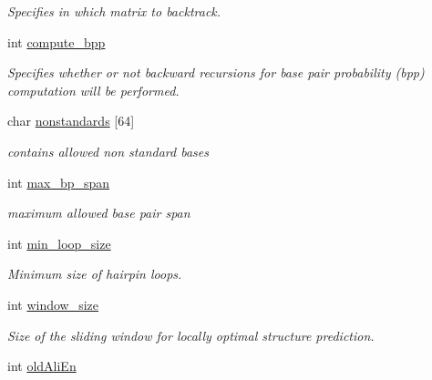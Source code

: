 \begin{DoxyCompactItemize}
\begin{DoxyCompactList}\small\item\em Specifies in which matrix to backtrack. \end{DoxyCompactList}\item 
int \hyperlink{structvrna__md__s_aa0c3e03d9064363e27adcc92b8d0380f}{compute\+\_\+bpp}\hypertarget{structvrna__md__s_aa0c3e03d9064363e27adcc92b8d0380f}{}\label{structvrna__md__s_aa0c3e03d9064363e27adcc92b8d0380f}

\begin{DoxyCompactList}\small\item\em Specifies whether or not backward recursions for base pair probability (bpp) computation will be performed. \end{DoxyCompactList}\item 
char \hyperlink{structvrna__md__s_a3fde4ac9eaf972f503c7a76726cefb59}{nonstandards} \mbox{[}64\mbox{]}\hypertarget{structvrna__md__s_a3fde4ac9eaf972f503c7a76726cefb59}{}\label{structvrna__md__s_a3fde4ac9eaf972f503c7a76726cefb59}

\begin{DoxyCompactList}\small\item\em contains allowed non standard bases \end{DoxyCompactList}\item 
int \hyperlink{structvrna__md__s_a659e5fcc6e8c9f1a68e7de6548eef3b0}{max\+\_\+bp\+\_\+span}\hypertarget{structvrna__md__s_a659e5fcc6e8c9f1a68e7de6548eef3b0}{}\label{structvrna__md__s_a659e5fcc6e8c9f1a68e7de6548eef3b0}

\begin{DoxyCompactList}\small\item\em maximum allowed base pair span \end{DoxyCompactList}\item 
int \hyperlink{structvrna__md__s_a9ed7ba42fcc46915c5c0c524f3d255f5}{min\+\_\+loop\+\_\+size}
\begin{DoxyCompactList}\small\item\em Minimum size of hairpin loops. \end{DoxyCompactList}\item 
int \hyperlink{structvrna__md__s_abea42f9229f8d8d6bcbedef316315bfc}{window\+\_\+size}\hypertarget{structvrna__md__s_abea42f9229f8d8d6bcbedef316315bfc}{}\label{structvrna__md__s_abea42f9229f8d8d6bcbedef316315bfc}

\begin{DoxyCompactList}\small\item\em Size of the sliding window for locally optimal structure prediction. \end{DoxyCompactList}\item 
int \hyperlink{structvrna__md__s_ab53aec4503130877973c6111ae6f0f76}{old\+Ali\+En}\hypertarget{structvrna__md__s_ab53aec4503130877973c6111ae6f0f76}{}\label{structvrna__md__s_ab53aec4503130877973c6111ae6f0f76}


\end{DoxyCompactItemize}
